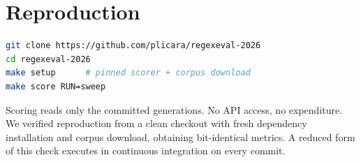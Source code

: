 \documentclass[11pt]{article}
\begin{document}
\section{Reproduction}

\begin{lstlisting}[language=bash]
git clone https://github.com/plicara/regexeval-2026
cd regexeval-2026
make setup      # pinned scorer + corpus download
make score RUN=sweep
\end{lstlisting}

Scoring reads only the committed generations. No API access, no
expenditure. We verified reproduction from a clean checkout with fresh
dependency installation and corpus download, obtaining bit-identical metrics.
A reduced form of this check executes in continuous integration on every
commit.
\end{document}
